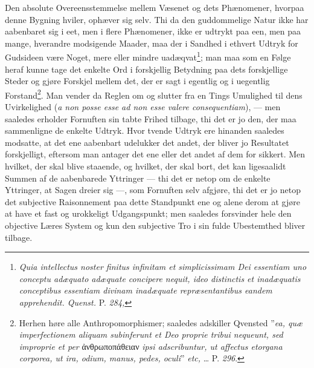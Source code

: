 \documentclass[12pt]{book}
\newcommand{\opage}[1]{\marginnote{\footnotesize\textit{[#1]}}}
\begin{document}
Den absolute Overeensstemmelse mellem Væsenet og dets Phænomener, hvorpaa
denne Bygning hviler, ophæver sig selv.
\opage{83} \setcounter{footnote}{0}%
Thi da den guddommelige Natur ikke har aabenbaret sig i eet, men i flere
Phænomener, ikke er udtrykt paa een, men paa mange, hverandre modsigende
Maader, maa der i Sandhed i ethvert Udtryk for Gudsideen være Noget, mere
eller mindre uadæqvat\footnote{\textit{Quia intellectus noster finitus
infinitam et simplicissimam Dei essentiam uno conceptu adæquato adæquate
concipere nequit, ideo distinctis et inadæquatis conceptibus essentiam
divinam inadæquate repræsentantibus eandem apprehendit. Quenst.} P.
\textit{284,}}; man maa som en Følge heraf kunne tage det enkelte Ord i
forskjellig Betydning paa dets forskjellige Steder og gjøre Forskjel mellem
det, der er sagt i egentlig og i uegentlig Forstand\footnote{Herhen høre alle
Anthropomorphismer; saaledes adskiller Qvensted ”\textit{ea, quæ
imperfectionem aliquam subinferunt et Deo proprie tribui nequeunt, sed
improprie et per} ἀνθρωποπάθειαν \textit{ipsi adscribuntur, ut affectus
etorgana corporea, ut ira, odium, manus, pedes, oculi}” \textit{etc,} \ldots{}
P. \textit{296}.}. Man vender da Reglen om og slutter fra en Tings Umulighed
til dens Uvirkelighed (\textit{a non posse esse ad non esse valere
consequentiam}), --- men saaledes erholder Fornuften sin tabte Frihed
tilbage, thi det er jo den, der maa sammenligne de enkelte Udtryk. Hvor
tvende Udtryk ere hinanden saaledes modsatte, at det ene aabenbart udelukker
det andet, der bliver jo Resultatet forskjelligt, eftersom man antager det
ene eller det andet af dem for sikkert. Men hvilket, der skal blive staaende,
og hvilket, der skal bort, det kan ligesaalidt Summen af de aabenbarede
Yttringer --- thi det er netop om de enkelte Yttringer, at Sagen dreier sig
---, som Fornuften selv afgjøre, thi det er jo netop det subjective
Raisonnement paa dette Standpunkt ene og alene derom at gjøre at have et fast
og urokkeligt Udgangspunkt; men saaledes forsvinder hele den objective Læres
System og kun den subjective Tro i sin fulde Ubestemthed bliver tilbage.
\end{document}
